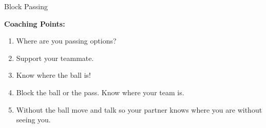\begin{evenBlock}{Block Passing}
\begin{minipage}[t]{\linewidth}
\begin{minipage}{.5\linewidth}
        \textbf{Coaching Points:}
        \begin{enumerate}
        \setlength{\itemsep}{0pt}
        \setlength{\parskip}{0pt}
        \setlength{\parsep}{0pt}
        \item Where are you passing options?
        \item Support your teammate.
        \item Know where the ball is!
        \item Block the ball or the pass.  Know where your team is.
        \item Without the ball move and talk so your partner knows where you are without seeing you.
        \end{enumerate}
    \end{minipage}
\end{minipage}

\end{evenBlock}